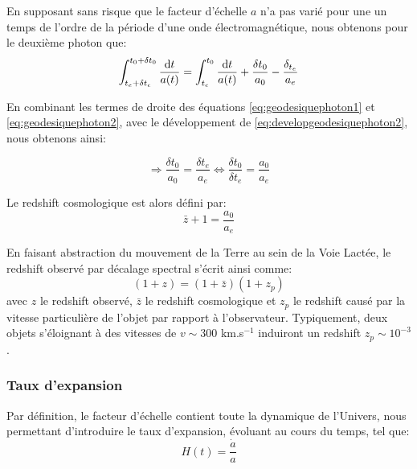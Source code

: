 \documentclass[../main/main.tex]{subfiles}
\begin{document}
En supposant sans risque que le facteur d'échelle $a$ n'a pas varié pour
une un temps de l'ordre de la période d'une onde électromagnétique, nous obtenons pour le deuxième photon que:
\begin{equation}
  \label{eq:developgeodesiquephoton2}
  \int_{t_{e}+\delta t_{e}}^{t_{0}+\delta t_{0}}\frac{\mathrm{d} t}{a(t)} =
  \int_{t_{e}}^{t_{0}}\frac{\mathrm{d} t}{a(t)} + \frac{\delta t_{0}}{a_{0}} - \frac{\delta_{t_{e}}}{a_{e}}
\end{equation}

En combinant les termes de droite des équations
\ref{eq:geodesiquephoton1} et \ref{eq:geodesiquephoton2}, avec le
développement de \ref{eq:developgeodesiquephoton2}, nous obtenons ainsi:

\begin{equation*}
  \Rightarrow \frac{\delta t_{0}}{a_{0}} = \frac{\delta t_{e}}{a_{e}}
  \Leftrightarrow \frac{\delta t_{0}}{\delta t_{e}} = \frac{a_{0}}{a_{e}}
\end{equation*}

Le redshift cosmologique est alors défini par:
\begin{equation}
  \label{eq:zcosmo}
  \bar{z}+1=\frac{a_{0}}{a_{e}}
\end{equation}

En faisant abstraction du mouvement de la Terre au sein de la Voie
Lactée, le redshift observé par décalage spectral s'écrit ainsi comme:
\begin{equation}
  \label{eq:22}
  (1+z)=(1+\bar{z})(1+z_{p})
\end{equation}
avec $z$ le redshift observé, $\bar{z}$ le redshift cosmologique et
$z_{p}$ le redshift causé par la vitesse particulière de l’objet par
rapport à l’observateur. Typiquement, deux objets s'éloignant à des
vitesses de $v\sim300$ km.s$^{-1}$ induiront un redshift $z_{p}\sim10^{-3}$.

\subsubsection{Taux d'expansion}

Par définition, le facteur d'échelle contient toute la dynamique de l'Univers,
nous permettant d'introduire le taux d'expansion, évoluant au cours du
temps, tel que:
\begin{equation}
  \label{eq:hubble}
  H(t)=\frac{\dot{a}}{a}
\end{equation}
\end{document}
